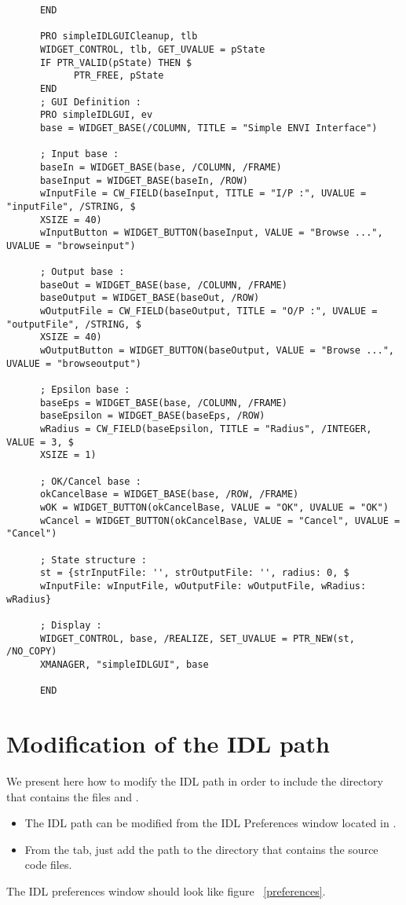 \begin{verbatim}
      END

      PRO simpleIDLGUICleanup, tlb
      WIDGET_CONTROL, tlb, GET_UVALUE = pState
      IF PTR_VALID(pState) THEN $
            PTR_FREE, pState
      END
      ; GUI Definition :
      PRO simpleIDLGUI, ev
      base = WIDGET_BASE(/COLUMN, TITLE = "Simple ENVI Interface")

      ; Input base :
      baseIn = WIDGET_BASE(base, /COLUMN, /FRAME)
      baseInput = WIDGET_BASE(baseIn, /ROW)
      wInputFile = CW_FIELD(baseInput, TITLE = "I/P :", UVALUE = "inputFile", /STRING, $
      XSIZE = 40)
      wInputButton = WIDGET_BUTTON(baseInput, VALUE = "Browse ...", UVALUE = "browseinput")

      ; Output base :
      baseOut = WIDGET_BASE(base, /COLUMN, /FRAME)
      baseOutput = WIDGET_BASE(baseOut, /ROW)
      wOutputFile = CW_FIELD(baseOutput, TITLE = "O/P :", UVALUE = "outputFile", /STRING, $
      XSIZE = 40)
      wOutputButton = WIDGET_BUTTON(baseOutput, VALUE = "Browse ...", UVALUE = "browseoutput")

      ; Epsilon base :
      baseEps = WIDGET_BASE(base, /COLUMN, /FRAME)
      baseEpsilon = WIDGET_BASE(baseEps, /ROW)
      wRadius = CW_FIELD(baseEpsilon, TITLE = "Radius", /INTEGER, VALUE = 3, $
      XSIZE = 1)

      ; OK/Cancel base :
      okCancelBase = WIDGET_BASE(base, /ROW, /FRAME)
      wOK = WIDGET_BUTTON(okCancelBase, VALUE = "OK", UVALUE = "OK")
      wCancel = WIDGET_BUTTON(okCancelBase, VALUE = "Cancel", UVALUE = "Cancel")

      ; State structure :
      st = {strInputFile: '', strOutputFile: '', radius: 0, $
      wInputFile: wInputFile, wOutputFile: wOutputFile, wRadius: wRadius}

      ; Display :
      WIDGET_CONTROL, base, /REALIZE, SET_UVALUE = PTR_NEW(st, /NO_COPY)
      XMANAGER, "simpleIDLGUI", base

      END
\end{verbatim}

\section{Modification of the IDL path} 

We present here how to modify the IDL path in order to include the directory that contains the files  and .
\begin{itemize}
    \item The IDL path can be modified from the IDL Preferences window located in . 
    \item From the  tab, just add the path to the directory that contains the source code files.
\end{itemize}
The IDL preferences window should look like figure ~\ref{preferences}.

